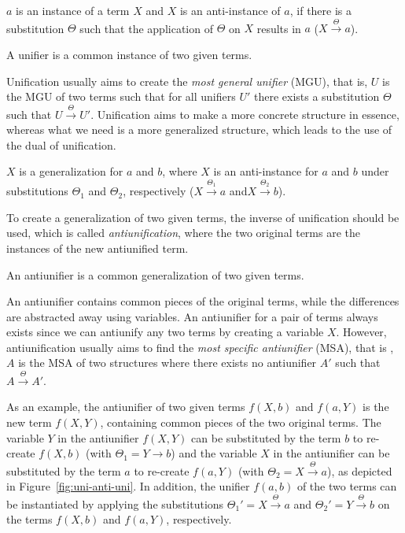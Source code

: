 \begin{defn}\label{def:instance}
$a$ is an instance of a term $X$ and $X$ is an anti-instance of $a$, if there is a substitution $\Theta$ such that the application of $\Theta$ on $X$ results in $a$ ($X\xrightarrow{\Theta}a$).
\end{defn}

\begin{defn}[Unifier]\label{def:unifier}
A unifier is a common instance of two given terms.
\end{defn}

Unification usually aims to create the \emph{most general unifier} (MGU), that is, $U$ is the MGU of two terms such that for all unifiers $U'$ there exists a substitution $\Theta$ such that $U\xrightarrow{\Theta}U'$. Unification aims to make a more concrete structure in essence, whereas what we need is a more generalized structure, which leads to the use of the dual of unification.

\begin{defn}[Generalization]\label{def:generalization}
$X$ is a generalization for $a$ and $b$, where $X$ is an anti-instance for $a$ and $b$ under substitutions $\Theta_1$ and $\Theta_2$, respectively ($X\xrightarrow{\Theta_1}a$ and$X\xrightarrow{\Theta_2}b$).
\end{defn}
To create a generalization of two given terms, the inverse of unification should be used, which is called \emph{antiunification}, where the two original terms are the instances of the new antiunified term.

\begin{defn}[Antiunifier]\label{def:antiunifier}
An antiunifier is a common generalization of two given terms.
\end{defn}

An antiunifier contains common pieces of the original terms, while the differences are abstracted away using variables. An antiunifier for a pair of terms always exists since we can antiunify any two terms by creating a variable $X$. However, antiunification usually aims to find the \emph{most specific antiunifier} (MSA), that is , $A$ is the MSA of two structures where there exists no antiunifier $A'$ such that $A\xrightarrow{\Theta}A'$.

As an example, the antiunifier of two given terms $f(X,b)$ and $f(a,Y)$ is the new term $f(X,Y)$, containing common pieces of the two original terms. The variable $Y$ in the antiunifier $f(X,Y)$ can be substituted by the term $b$ to re-create $f(X,b)$ (with $\Theta_1 = Y\xrightarrow{}b$) and the variable $X$ in the antiunifier can be substituted by the term $a$ to re-create $f(a,Y)$
(with $\Theta_2 = X\xrightarrow{\Theta}a$), as depicted in Figure~\ref{fig:uni-anti-uni}.
In addition, the unifier $f(a,b)$ of the two terms can be instantiated by applying the substitutions $\Theta_1'=X\xrightarrow{\Theta}a$ and $\Theta_2'=Y\xrightarrow{\Theta}b$ on the terms $f(X,b)$ and $f(a,Y)$, respectively.

